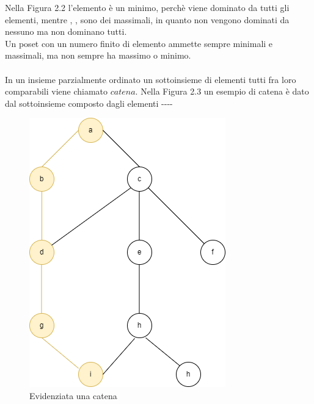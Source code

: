 \documentclass[a4paper,12pt, openright]{report}
\begin{document}
Nella Figura 2.2 l'elemento  è un minimo, perchè viene dominato da tutti gli elementi, mentre , ,  sono dei massimali,
in quanto non vengono dominati da nessuno ma non dominano tutti. \\
Un poset con un numero finito di elemento ammette sempre minimali e massimali, ma non sempre ha massimo o minimo. \\
\\ 
In un insieme parzialmente ordinato un sottoinsieme di elementi tutti fra loro comparabili viene chiamato $\textit{catena}$.
Nella Figura 2.3 un esempio di catena è dato dal sottoinsieme composto dagli elementi ----\\
\begin{figure}[H]
    \centering
    \includegraphics[scale=.5]{hasse_catena.png}
    \caption{Evidenziata una catena}
\end{figure}
\end{document}
